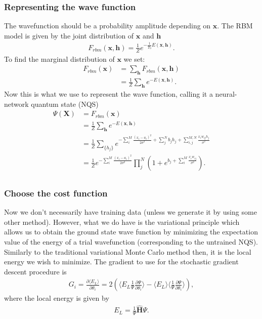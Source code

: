 \documentclass{beamer}
\begin{document}
\begin{frame}
\frametitle{Representing the wave function}

The wavefunction should be a probability amplitude depending on $\bm{x}$. The RBM model is given by the joint distribution of $\bm{x}$ and $\bm{h}$
\begin{align}
	F_{rbm}(\mathbf{x},\mathbf{h}) = \frac{1}{Z} e^{-\frac{1}{T_0}E(\mathbf{x},\mathbf{h})}.
\end{align}
To find the marginal distribution of $\bm{x}$ we set:
\begin{align}
	F_{rbm}(\mathbf{x}) &= \sum_\mathbf{h} F_{rbm}(\mathbf{x}, \mathbf{h}) \\
				&= \frac{1}{Z}\sum_\mathbf{h} e^{-E(\mathbf{x}, \mathbf{h})}.
\end{align}
Now this is what we use to represent the wave function, calling it a neural-network quantum state (NQS)
\begin{align}
	\Psi (\mathbf{X}) &= F_{rbm}(\mathbf{x}) \\
	&= \frac{1}{Z}\sum_{\bm{h}} e^{-E(\mathbf{x}, \mathbf{h})} \\
	&= \frac{1}{Z} \sum_{\{h_j\}} e^{-\sum_i^M \frac{(x_i - a_i)^2}{2\sigma^2} + \sum_j^N b_j h_j + \sum_{i,j}^{M,N} \frac{x_i w_{ij} h_j}{\sigma^2}} \\
	&= \frac{1}{Z} e^{-\sum_i^M \frac{(x_i - a_i)^2}{2\sigma^2}} \prod_j^N (1 + e^{b_j + \sum_i^M \frac{x_i w_{ij}}{\sigma^2}}). \\
\end{align}
\end{frame}

\begin{frame}
\frametitle{Choose the cost function}

Now we don't necessarily have training data (unless we generate it by using some other method). However, what we do have is the variational principle which allows us to obtain the ground state wave function by minimizing the expectation value of the energy of a trial wavefunction (corresponding to the untrained NQS). Similarly to the traditional variational Monte Carlo method then, it is the local energy we wish to minimize. The gradient to use for the stochastic gradient descent procedure is
\begin{align}
	G_i = \frac{\partial \langle E_L \rangle}{\partial \theta_i}
	= 2(\langle E_L \frac{1}{\Psi}\frac{\partial \Psi}{\partial \theta_i} \rangle - \langle E_L \rangle \langle \frac{1}{\Psi}\frac{\partial \Psi}{\partial \theta_i} \rangle ),
\end{align}
where the local energy is given by
\begin{align}
	E_L = \frac{1}{\Psi} \hat{\mathbf{H}} \Psi.
\end{align}
\end{frame}
\end{document}
